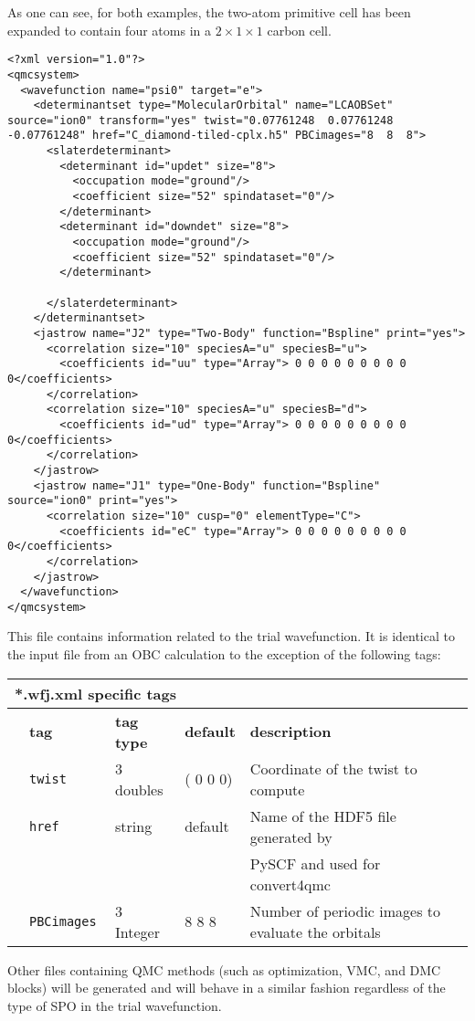  As one can see, for both examples, the two-atom primitive cell has been expanded to contain four atoms in a $2 \times 1 \times 1$ carbon cell.
\begin{lstlisting}[style=QMCPXML,caption=C_diamond-tiled-cplx.wfj.xml. This file contains the trial wavefunction.]
<?xml version="1.0"?>
<qmcsystem>
  <wavefunction name="psi0" target="e">
    <determinantset type="MolecularOrbital" name="LCAOBSet" source="ion0" transform="yes" twist="0.07761248  0.07761248  -0.07761248" href="C_diamond-tiled-cplx.h5" PBCimages="8  8  8">
      <slaterdeterminant>
        <determinant id="updet" size="8">
          <occupation mode="ground"/>
          <coefficient size="52" spindataset="0"/>
        </determinant>
        <determinant id="downdet" size="8">
          <occupation mode="ground"/>
          <coefficient size="52" spindataset="0"/>
        </determinant>

      </slaterdeterminant>
    </determinantset>
    <jastrow name="J2" type="Two-Body" function="Bspline" print="yes">
      <correlation size="10" speciesA="u" speciesB="u">
        <coefficients id="uu" type="Array"> 0 0 0 0 0 0 0 0 0 0</coefficients>
      </correlation>
      <correlation size="10" speciesA="u" speciesB="d">
        <coefficients id="ud" type="Array"> 0 0 0 0 0 0 0 0 0 0</coefficients>
      </correlation>
    </jastrow>
    <jastrow name="J1" type="One-Body" function="Bspline" source="ion0" print="yes">
      <correlation size="10" cusp="0" elementType="C">
        <coefficients id="eC" type="Array"> 0 0 0 0 0 0 0 0 0 0</coefficients>
      </correlation>
    </jastrow>
  </wavefunction>
</qmcsystem>
 \end{lstlisting}
This file contains information related to the trial wavefunction. It is identical to the input file from an OBC calculation to the exception of the following tags:\\
\begin{table}[h]
\begin{center}
\begin{tabularx}{\textwidth}{l l l l l }
\hline
\multicolumn{5}{l}{*.wfj.xml specific tags} \\
\hline
   &   \bfseries tag     & \bfseries tag type & \bfseries default   & \bfseries description \\
   &   \texttt{twist             } &  3 doubles  &  ( 0 0 0)& Coordinate of the twist to compute\\
   &   \texttt{href             } &  string  & default& Name of the HDF5 file generated by\\ 
   &                              &          &        &  PySCF and used for convert4qmc\\  
   &   \texttt{PBCimages            } &  3 Integer   & 8 8 8  & Number of periodic images to evaluate the orbitals\\
    \hline
    \end{tabularx}
\end{center}
\end{table}

Other files containing QMC methods (such as optimization, VMC, and DMC blocks) will be generated and will behave in a similar fashion regardless of the type of SPO in the trial wavefunction. 




 

